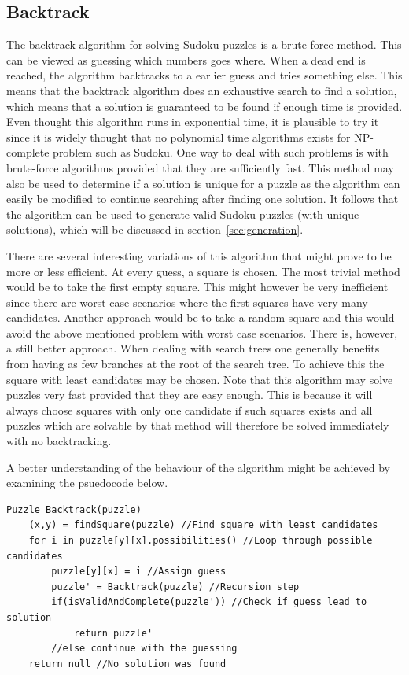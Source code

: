\documentclass[a4paper,11pt]{kth-mag}
\begin{document}
\subsection{Backtrack}
The backtrack algorithm for solving Sudoku puzzles is a brute-force method.
This can be viewed as guessing which numbers goes where.
When a dead end is reached, the algorithm backtracks to a earlier guess and tries something else.
This means that the backtrack algorithm does an exhaustive search to find a solution, which means that a solution is guaranteed to be found if enough time is provided.
Even thought this algorithm runs in exponential time, it is plausible to try it since it is widely thought that no polynomial time algorithms exists for NP-complete problem such as Sudoku. 
One way to deal with such problems is with brute-force algorithms provided that they are sufficiently fast.
This method may also be used to determine if a solution is unique for a puzzle as the algorithm can easily be modified to continue searching after finding one solution.
It follows that the algorithm can be used to generate valid Sudoku puzzles (with unique solutions), which will be discussed in section~\ref{sec:generation}.

There are several interesting variations of this algorithm that might prove to be more or less efficient.
At every guess, a square is chosen.
The most trivial method would be to take the first empty square.
This might however be very inefficient since there are worst case scenarios where the first squares have very many candidates.
Another approach would be to take a random square and this would avoid the above mentioned problem with worst case scenarios.
There is, however, a still better approach.
When dealing with search trees one generally benefits from having as few branches at the root of the search tree.
To achieve this the square with least candidates may be chosen.
Note that this algorithm may solve puzzles very fast provided that they are easy enough.
This is because it will always choose squares with only one candidate if such squares exists and all puzzles which are solvable by that method will therefore be solved immediately with no backtracking.

A better understanding of the behaviour of the algorithm might be achieved by examining the psuedocode below.

\begin{verbatim}
Puzzle Backtrack(puzzle)
    (x,y) = findSquare(puzzle) //Find square with least candidates
    for i in puzzle[y][x].possibilities() //Loop through possible candidates
        puzzle[y][x] = i //Assign guess
        puzzle' = Backtrack(puzzle) //Recursion step 
        if(isValidAndComplete(puzzle')) //Check if guess lead to solution
            return puzzle'
        //else continue with the guessing
    return null //No solution was found
\end{verbatim}
\end{document}
